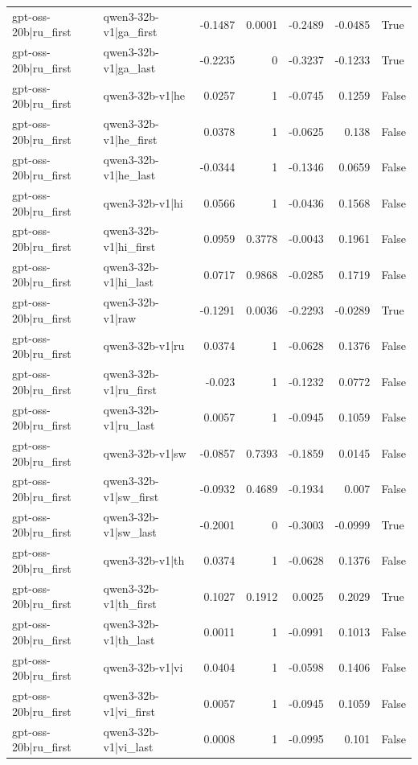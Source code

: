 \begin{table}
\begin{tabular}{l l r r r r l}
gpt-oss-20b|ru_first & qwen3-32b-v1|ga_first & -0.1487 & 0.0001 & -0.2489 & -0.0485 & True \\
gpt-oss-20b|ru_first & qwen3-32b-v1|ga_last & -0.2235 & 0 & -0.3237 & -0.1233 & True \\
gpt-oss-20b|ru_first & qwen3-32b-v1|he & 0.0257 & 1 & -0.0745 & 0.1259 & False \\
gpt-oss-20b|ru_first & qwen3-32b-v1|he_first & 0.0378 & 1 & -0.0625 & 0.138 & False \\
gpt-oss-20b|ru_first & qwen3-32b-v1|he_last & -0.0344 & 1 & -0.1346 & 0.0659 & False \\
gpt-oss-20b|ru_first & qwen3-32b-v1|hi & 0.0566 & 1 & -0.0436 & 0.1568 & False \\
gpt-oss-20b|ru_first & qwen3-32b-v1|hi_first & 0.0959 & 0.3778 & -0.0043 & 0.1961 & False \\
gpt-oss-20b|ru_first & qwen3-32b-v1|hi_last & 0.0717 & 0.9868 & -0.0285 & 0.1719 & False \\
gpt-oss-20b|ru_first & qwen3-32b-v1|raw & -0.1291 & 0.0036 & -0.2293 & -0.0289 & True \\
gpt-oss-20b|ru_first & qwen3-32b-v1|ru & 0.0374 & 1 & -0.0628 & 0.1376 & False \\
gpt-oss-20b|ru_first & qwen3-32b-v1|ru_first & -0.023 & 1 & -0.1232 & 0.0772 & False \\
gpt-oss-20b|ru_first & qwen3-32b-v1|ru_last & 0.0057 & 1 & -0.0945 & 0.1059 & False \\
gpt-oss-20b|ru_first & qwen3-32b-v1|sw & -0.0857 & 0.7393 & -0.1859 & 0.0145 & False \\
gpt-oss-20b|ru_first & qwen3-32b-v1|sw_first & -0.0932 & 0.4689 & -0.1934 & 0.007 & False \\
gpt-oss-20b|ru_first & qwen3-32b-v1|sw_last & -0.2001 & 0 & -0.3003 & -0.0999 & True \\
gpt-oss-20b|ru_first & qwen3-32b-v1|th & 0.0374 & 1 & -0.0628 & 0.1376 & False \\
gpt-oss-20b|ru_first & qwen3-32b-v1|th_first & 0.1027 & 0.1912 & 0.0025 & 0.2029 & True \\
gpt-oss-20b|ru_first & qwen3-32b-v1|th_last & 0.0011 & 1 & -0.0991 & 0.1013 & False \\
gpt-oss-20b|ru_first & qwen3-32b-v1|vi & 0.0404 & 1 & -0.0598 & 0.1406 & False \\
gpt-oss-20b|ru_first & qwen3-32b-v1|vi_first & 0.0057 & 1 & -0.0945 & 0.1059 & False \\
gpt-oss-20b|ru_first & qwen3-32b-v1|vi_last & 0.0008 & 1 & -0.0995 & 0.101 & False \\

\end{tabular}
\end{table}
